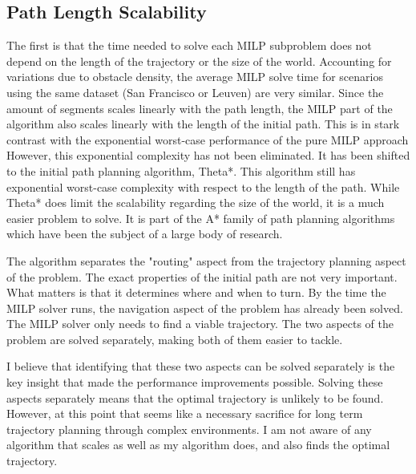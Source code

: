 \subsection{Path Length Scalability}
The first is that the time needed to solve each MILP subproblem does not depend on the length of the trajectory or the size of the world. Accounting for variations due to obstacle density, the average MILP solve time for scenarios using the same dataset (San Francisco or Leuven) are very similar. Since the amount of segments scales linearly with the path length, the MILP part of the algorithm also scales linearly with the length of the initial path. This is in stark contrast with the exponential worst-case performance of the pure MILP approach\\
However, this exponential complexity has not been eliminated. It has been shifted to the initial path planning algorithm, Theta*. This algorithm still has exponential worst-case complexity with respect to the length of the path. While Theta* does limit the scalability regarding the size of the world, it is a much easier problem to solve. It is part of the A* family of path planning algorithms which have been the subject of a large body of research.
\par
The algorithm separates the "routing" aspect from the trajectory planning aspect of the problem. The exact properties of the initial path are not very important. What matters is that it determines where and when to turn. By the time the MILP solver runs, the navigation aspect of the problem has already been solved. The MILP solver only needs to find a viable trajectory. The two aspects of the problem are solved separately, making both of them easier to tackle.
\par
I believe that identifying that these two aspects can be solved separately is the key insight that made the performance improvements possible. Solving these aspects separately means that the optimal trajectory is unlikely to be found. However, at this point that seems like a necessary sacrifice for long term trajectory planning through complex environments. I am not aware of any algorithm that scales as well as my algorithm does, and also finds the optimal trajectory.

